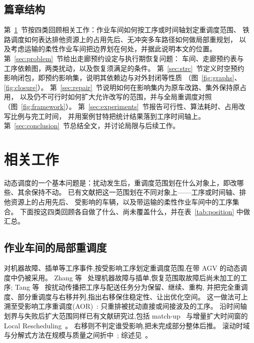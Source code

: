 \documentclass[manuscript,screen,review]{acmart}
\begin{document}
\subsection{篇章结构}

第~\ref{sec:related_work}~节按四类回顾相关工作：作业车间如何按工序或时间轴划定重调度范围、
铁路调度如何表达排他资源上的占用先后、无冲突多车路径如何做局部重规划，
以及考虑运输的柔性作业车间把边界划在何处，并据此说明本文的位置。
第~\ref{sec:problem}~节给出走廊预约设定与执行期恢复问题：
车间、走廊预约表与工序依赖图，两类扰动，以及恢复须满足的条件。
第~\ref{sec:strc}~节定义时空预约影响闭包，即预约影响集，说明其依赖边与对外封闭等性质
（图~\ref{fig:graphs}、\ref{fig:closure}）。
第~\ref{sec:repair}~节说明如何在影响集内为原车改路、集外保持原占用，
以及仍不可行时如何扩大允许改写的范围，并与全局重调度对照（图~\ref{fig:framework}）。
第~\ref{sec:experiments}~节报告可行性、算法耗时、占用改写比例与完工时间，
并用案例甘特把统计结果落到工序时间轴上。
第~\ref{sec:conclusion}~节总结全文，并讨论局限与后续工作。

\section{相关工作}
\label{sec:related_work}


动态调度的一个基本问题是：扰动发生后，重调度范围划在什么对象上，即改哪些、其余保持不动。
已有文献把这一范围划在不同对象上——工序或时间轴、排他资源上的占用先后、
受影响的车辆，以及带运输的柔性作业车间中的工序集合。
下面按这四类回顾各自做了什么、尚未覆盖什么，并在表~\ref{tab:position} 中做汇总。

\subsection{作业车间的局部重调度}
\label{sec:rw_aor}

对机器故障、插单等工序事件,按受影响工序划定重调度范围,在带 AGV 的动态调度中仍被采用。
Zhang 等~\cite{zhang2023energy} 处理机器故障与插单,恢复范围取故障后尚未加工的工序;
Tang 等~\cite{tang2026dynamic} 按扰动传播把工序与配送任务分为保留、继续、重构,
并把完全重调度、部分重调度与右移并列,指出右移保住稳定性、让出优化空间。
这一做法可上溯至受影响工序重调度(AOR)~\cite{abumaizar1997rescheduling,subramaniam2003maor}:
只重排被扰动直接或间接波及的工序。
沿时间轴划界与失败后扩大范围同样已有文献研究过,包括 match-up~\cite{akturk1999matchup}
与增量扩大时间窗的 Local Rescheduling~\cite{kuster2007local}。
右移则不判定谁受影响,把未完成部分整体后推。
滚动时域与分解式方法在规模与质量之间折中~\cite{zeitrag2025novel,zhao2019decomposition};
综述见~\cite{vieira2003rescheduling,ouelhadj2009survey}。
\end{document}
